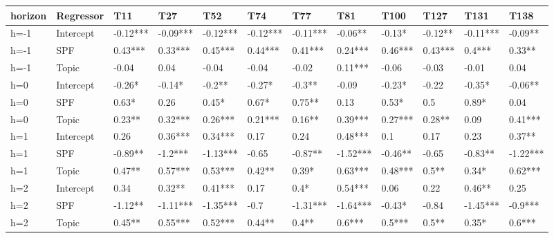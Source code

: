 \begin{table}[!h]
\centering\begingroup\fontsize{8}{10}\selectfont

\begin{tabular}{llllllllllll}
\toprule
horizon & Regressor & T11 & T27 & T52 & T74 & T77 & T81 & T100 & T127 & T131 & T138\\
\midrule
h=-1 & Intercept & -0.12*** & -0.09*** & -0.12*** & -0.12*** & -0.11*** & -0.06** & -0.13* & -0.12** & -0.11*** & -0.09**\\
\addlinespace[0.3em]
h=-1 & SPF & 0.43*** & 0.33*** & 0.45*** & 0.44*** & 0.41*** & 0.24*** & 0.46*** & 0.43*** & 0.4*** & 0.33**\\
\addlinespace[0.3em]
h=-1 & Topic & -0.04 & 0.04 & -0.04 & -0.04 & -0.02 & 0.11*** & -0.06 & -0.03 & -0.01 & 0.04\\
\addlinespace[0.3em]
h=0 & Intercept & -0.26* & -0.14* & -0.2** & -0.27* & -0.3** & -0.09 & -0.23* & -0.22 & -0.35* & -0.06**\\
\addlinespace[0.3em]
h=0 & SPF & 0.63* & 0.26 & 0.45* & 0.67* & 0.75** & 0.13 & 0.53* & 0.5 & 0.89* & 0.04\\
\addlinespace[0.3em]
h=0 & Topic & 0.23** & 0.32*** & 0.26*** & 0.21*** & 0.16** & 0.39*** & 0.27*** & 0.28** & 0.09 & 0.41***\\
\addlinespace[0.3em]
h=1 & Intercept & 0.26 & 0.36*** & 0.34*** & 0.17 & 0.24 & 0.48*** & 0.1 & 0.17 & 0.23 & 0.37**\\
\addlinespace[0.3em]
h=1 & SPF & -0.89** & -1.2*** & -1.13*** & -0.65 & -0.87** & -1.52*** & -0.46** & -0.65 & -0.83** & -1.22***\\
\addlinespace[0.3em]
h=1 & Topic & 0.47** & 0.57*** & 0.53*** & 0.42** & 0.39* & 0.63*** & 0.48*** & 0.5** & 0.34* & 0.62***\\
\addlinespace[0.3em]
h=2 & Intercept & 0.34 & 0.32** & 0.41*** & 0.17 & 0.4* & 0.54*** & 0.06 & 0.22 & 0.46** & 0.25\\
\addlinespace[0.3em]
h=2 & SPF & -1.12** & -1.11*** & -1.35*** & -0.7 & -1.31*** & -1.64*** & -0.43* & -0.84 & -1.45*** & -0.9***\\
\addlinespace[0.3em]
h=2 & Topic & 0.45** & 0.55*** & 0.52*** & 0.44** & 0.4** & 0.6*** & 0.5*** & 0.5** & 0.35* & 0.6***\\
\bottomrule
\end{tabular}
\endgroup{}
\end{table}
